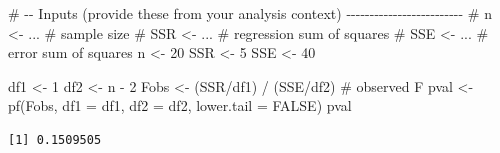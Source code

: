 \documentclass[
  letterpaper,
]{scrbook}
\newenvironment{Shaded}{\begin{snugshade}}{\end{snugshade}}
\newcommand{\AttributeTok}[1]{\textcolor[rgb]{0.40,0.45,0.13}{#1}}
\newcommand{\CommentTok}[1]{\textcolor[rgb]{0.37,0.37,0.37}{#1}}
\newcommand{\ConstantTok}[1]{\textcolor[rgb]{0.56,0.35,0.01}{#1}}
\newcommand{\DecValTok}[1]{\textcolor[rgb]{0.68,0.00,0.00}{#1}}
\newcommand{\FunctionTok}[1]{\textcolor[rgb]{0.28,0.35,0.67}{#1}}
\newcommand{\NormalTok}[1]{\textcolor[rgb]{0.00,0.23,0.31}{#1}}
\newcommand{\OtherTok}[1]{\textcolor[rgb]{0.00,0.23,0.31}{#1}}
\newcommand{\SpecialCharTok}[1]{\textcolor[rgb]{0.37,0.37,0.37}{#1}}
\begin{document}
\begin{Shaded}
\begin{Highlighting}[]
\CommentTok{\# {-}{-} Inputs (provide these from your analysis context) {-}{-}{-}{-}{-}{-}{-}{-}{-}{-}{-}{-}{-}{-}{-}{-}{-}{-}{-}{-}{-}{-}{-}{-}{-}}
\CommentTok{\# n   \textless{}{-} ...   \# sample size}
\CommentTok{\# SSR \textless{}{-} ...   \# regression sum of squares}
\CommentTok{\# SSE \textless{}{-} ...   \# error sum of squares}
\NormalTok{n   }\OtherTok{\textless{}{-}} \DecValTok{20}
\NormalTok{SSR }\OtherTok{\textless{}{-}} \DecValTok{5}
\NormalTok{SSE }\OtherTok{\textless{}{-}} \DecValTok{40}




\NormalTok{df1  }\OtherTok{\textless{}{-}} \DecValTok{1}
\NormalTok{df2  }\OtherTok{\textless{}{-}}\NormalTok{ n }\SpecialCharTok{{-}} \DecValTok{2}
\NormalTok{Fobs }\OtherTok{\textless{}{-}}\NormalTok{ (SSR}\SpecialCharTok{/}\NormalTok{df1) }\SpecialCharTok{/}\NormalTok{ (SSE}\SpecialCharTok{/}\NormalTok{df2)         }\CommentTok{\# observed F}
\NormalTok{pval }\OtherTok{\textless{}{-}} \FunctionTok{pf}\NormalTok{(Fobs, }\AttributeTok{df1 =}\NormalTok{ df1, }\AttributeTok{df2 =}\NormalTok{ df2, }\AttributeTok{lower.tail =} \ConstantTok{FALSE}\NormalTok{)}
\NormalTok{pval}
\end{Highlighting}
\end{Shaded}

\begin{verbatim}
[1] 0.1509505
\end{verbatim}
\end{document}

